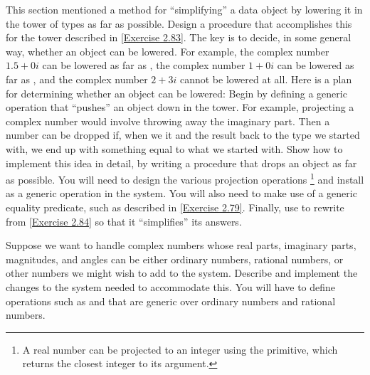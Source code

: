\begin{exercise}
	\label{Exercise 2.85}
	This section mentioned a method for “simplifying” a data object by lowering it in the tower of types as far as possible.
	Design a procedure  that accomplishes this for the tower described in \cref{Exercise 2.83}.
	The key is to decide, in some general way, whether an object can be lowered.
	For example, the complex number \( 1.5 + 0i \) can be lowered as far as , the complex number \( 1 + 0i \) can be lowered as far as , and the complex number \( 2 + 3i \) cannot be lowered at all.
	Here is a plan for determining whether an object can be lowered:
	Begin by defining a generic operation  that “pushes” an object down in the tower.
	For example, projecting a complex number would involve throwing away the imaginary part.
	Then a number can be dropped if, when we  it and  the result back to the type we started with, we end up with something equal to what we started with.
	Show how to implement this idea in detail, by writing a  procedure that drops an object as far as possible.
	You will need to design the various projection operations%
	\footnote{
		A real number can be projected to an integer using the  primitive, which returns the closest integer to its argument.
	}
	and install  as a generic operation in the system.
	You will also need to make use of a generic equality predicate, such as described in \cref{Exercise 2.79}.
	Finally, use  to rewrite  from \cref{Exercise 2.84} so that it “simplifies” its answers.
\end{exercise}



\begin{exercise}
	\label{Exercise 2.86}
	Suppose we want to handle complex numbers whose real parts, imaginary parts, magnitudes, and angles can be either ordinary numbers, rational numbers, or other numbers we might wish to add to the system.
	Describe and implement the changes to the system needed to accommodate this.
	You will have to define operations such as  and  that are generic over ordinary numbers and rational numbers.
\end{exercise}
